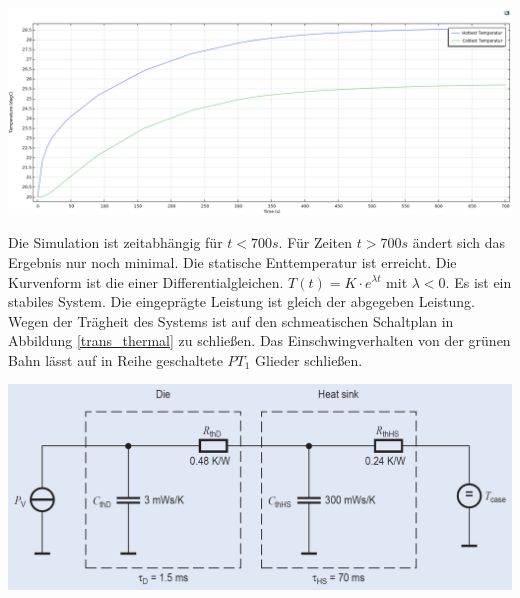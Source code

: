 \documentclass[10pt,a4paper,oneside,abstracton]{scrartcl}
\newenvironment{Figure}
  {\par\medskip\noindent\minipage{\linewidth}}
  {\endminipage\par\medskip}
\begin{document}
\begin{multicols}{2}
\begin{Figure}
	\includegraphics[width=\textwidth]{Bilder/time_dep.png}
	\label{timedep}
\end{Figure}
\noindent
Die Simulation ist zeitabhängig für $ t < 700s $. 
Für Zeiten $ t > 700s $ ändert sich das Ergebnis nur noch minimal. 
Die statische Enttemperatur ist erreicht. 
Die Kurvenform ist die einer Differentialgleichen. $ T(t) = K \cdot e^{\lambda t} $ mit
$ \lambda  < 0$. Es ist ein stabiles System. 
Die eingeprägte Leistung ist gleich der abgegeben Leistung. 
Wegen der Trägheit des Systems ist auf den schmeatischen Schaltplan in Abbildung \ref{trans_thermal} zu schließen. 
Das Einschwingverhalten von der grünen Bahn lässt auf in Reihe geschaltete $PT_1$ Glieder schließen. 
\begin{Figure}
	\includegraphics[width=\textwidth]{Bilder/trans_thermal.png}
	\label{trans_thermal}
\end{Figure}


\end{multicols}
\end{document}
